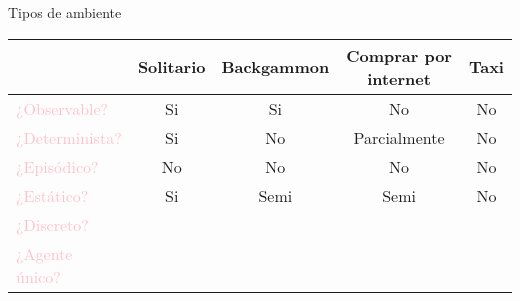 \documentclass{beamer}
\begin{document}

    \begin{frame}{Tipos de ambiente}
        \begin{center}
        \begin{tabular}{|l|c|c|c|c|} \hline
                \multicolumn{1}{|p{2cm}|}{\centering }
              & \multicolumn{1}{p{1.3cm}|}{\centering Solitario}
              & \multicolumn{1}{p{2.1cm}|}{\centering Backgammon}
              & \multicolumn{1}{p{3.4cm}|}{\centering Comprar por internet}
              & \multicolumn{1}{p{0.7cm}|}{\centering Taxi}
                \tabularnewline \hline
                \textcolor{Pink}{¿Observable?} & Si & Si & No & No \\
                \textcolor{Pink}{¿Determinista?} & Si & No & Parcialmente & No \\
                \textcolor{Pink}{¿Episódico?} & No & No & No & No \\
                \textcolor{Pink}{¿Estático?} & Si & Semi & Semi & No \\
                \textcolor{Pink}{¿Discreto?} &  &  & &  \\
                \textcolor{Pink}{¿Agente único?} &  &  &  &  \\ \hline
        \end{tabular}
        \end{center}
    \end{frame}
    
\end{document}
